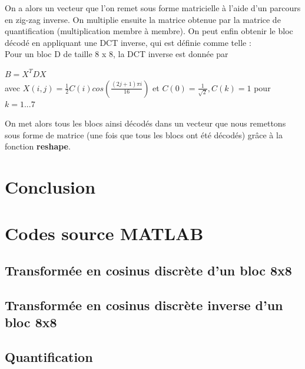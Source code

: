 \documentclass[a4paper, 12pt]{article}
\newcommand{\FSource}[1]{%

}
\begin{document}
On a alors un vecteur que l'on remet sous forme matricielle à l'aide d'un parcours en zig-zag inverse. On multiplie ensuite la matrice obtenue par la matrice de quantification (multiplication membre à membre). On peut enfin obtenir le bloc décodé en appliquant une DCT inverse, qui est définie comme telle :\\

Pour un bloc D de taille 8 x 8, la DCT inverse est donnée par

\begin{center}
$B = X^TDX$\\
avec $X(i,j)=\frac{1}{2}C(i)cos(\frac{(2j+1)\pi i}{16})$ et $C(0) = \frac{1}{\sqrt{2}}, C(k) = 1$ pour $k = 1 ... 7$
\end{center}

On met alors tous les blocs ainsi décodés dans un vecteur que nous remettons sous forme de matrice (une fois que tous les blocs ont été décodés) grâce à la fonction \textbf{reshape}.

\newpage

\section{Conclusion}



\clearpage

%
%
\appendix

\section{Codes source MATLAB}
\subsection{Transformée en cosinus discrète d'un bloc 8x8}\label{dct_code}

\FSource{../MyDCT.m}

\newpage

\subsection{Transformée en cosinus discrète inverse d'un bloc 8x8}\label{idct_code}

\FSource{../MyIDCT.m}

\newpage

\subsection{Quantification}\label{quant_code}
\end{document}
